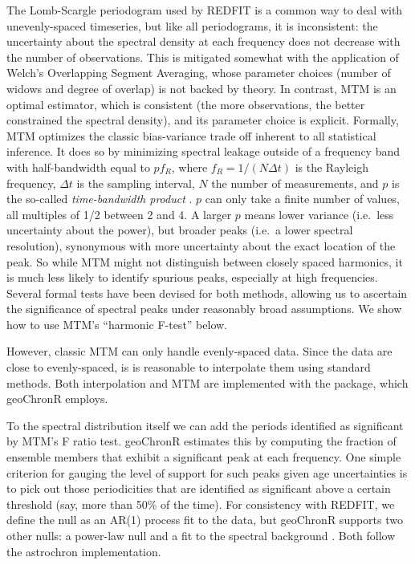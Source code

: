 \documentclass[gchron, manuscript]{copernicus}
\begin{document}
The Lomb-Scargle periodogram used by REDFIT is a common way to deal with
unevenly-spaced timeseries, but like all periodograms, it is
inconsistent: the uncertainty about the spectral density at each
frequency does not decrease with the number of observations. This is
mitigated somewhat with the application of Welch's Overlapping Segment
Averaging, whose parameter choices (number of widows and degree of
overlap) is not backed by theory. In contrast, MTM \citep{thomson82} is
an optimal estimator, which is consistent (the more observations, the
better constrained the spectral density), and its parameter choice is
explicit. Formally, MTM optimizes the classic bias-variance trade off
inherent to all statistical inference. It does so by minimizing spectral
leakage outside of a frequency band with half-bandwidth equal to
\(pf_R\), where \(f_R=1/(N \Delta t)\) is the Rayleigh frequency,
\(\Delta t\) is the sampling interval, \(N\) the number of measurements,
and \(p\) is the so-called \emph{time-bandwidth product} \citep{Ghil02}.
\(p\) can only take a finite number of values, all multiples of 1/2
between 2 and 4. A larger \(p\) means lower variance (i.e.~less
uncertainty about the power), but broader peaks (i.e.~a lower spectral
resolution), synonymous with more uncertainty about the exact location
of the peak. So while MTM might not distinguish between closely spaced
harmonics, it is much less likely to identify spurious peaks, especially
at high frequencies. Several formal tests have been devised for both
methods, allowing us to ascertain the significance of spectral peaks
under reasonably broad assumptions. We show how to use MTM's ``harmonic
F-test'' below.

However, classic MTM can only handle evenly-spaced data. Since the data
are close to evenly-spaced, is is reasonable to interpolate them using
standard methods. Both interpolation and MTM are implemented with the
\citep[astrochron][]{astrochron} package, which geoChronR employs.

To the spectral distribution itself we can add the periods identified as
significant by MTM's F ratio test. geoChronR estimates this by computing
the fraction of ensemble members that exhibit a significant peak at each
frequency. One simple criterion for gauging the level of support for
such peaks given age uncertainties is to pick out those periodicities
that are identified as significant above a certain threshold (say, more
than 50\% of the time). For consistency with REDFIT, we define the null
as an AR(1) process fit to the data, but geoChronR supports two other
nulls: a power-law null and a fit to the spectral background
\citep{MannLees96}. Both follow the astrochron implementation.
\end{document}
